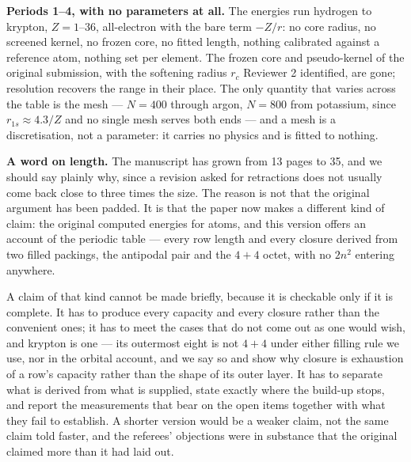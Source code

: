 \documentclass[11pt,a4paper]{article}
\begin{document}
\textbf{Periods 1--4, with no parameters at all.} The energies run hydrogen to krypton, $Z=1$--$36$,
all-electron with the bare term $-Z/r$: no core radius, no screened kernel, no frozen core, no fitted
length, nothing calibrated against a reference atom, nothing set per element. The frozen core and
pseudo-kernel of the original submission, with the softening radius $r_c$ Reviewer 2 identified, are
gone; resolution recovers the range in their place. The only quantity that varies across the table is
the mesh --- $N=400$ through argon, $N=800$ from potassium, since $r_{1s}\approx4.3/Z$ and no single
mesh serves both ends --- and a mesh is a discretisation, not a parameter: it carries no physics and is
fitted to nothing.

\textbf{A word on length.} The manuscript has grown from 13 pages to 35, and we should say plainly
why, since a revision asked for retractions does not usually come back close to three times the
size. The reason is not that the original argument has been padded. It is that the paper now makes
a different kind of claim: the original computed energies for atoms, and this version offers an
account of the periodic table --- every row length and every closure derived from two filled
packings, the antipodal pair and the $4{+}4$ octet, with no $2n^2$ entering anywhere.

A claim of that kind cannot be made briefly, because it is checkable only if it is complete. It has
to produce every capacity and every closure rather than the convenient ones; it has to meet the
cases that do not come out as one would wish, and krypton is one --- its outermost eight is not
$4{+}4$ under either filling rule we use, nor in the orbital account, and we say so and show why
closure is exhaustion of a row's capacity rather than the shape of its outer layer. It has to
separate what is derived from what is supplied, state exactly where the build-up stops, and report
the measurements that bear on the open items together with what they fail to establish. A shorter
version would be a weaker claim, not the same claim told faster, and the referees' objections were
in substance that the original claimed more than it had laid out.
\end{document}
